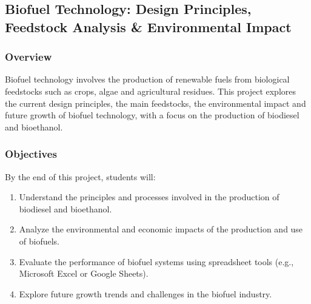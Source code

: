 \documentclass[11pt]{article}
\begin{document}
\subsection{Biofuel Technology: Design Principles, Feedstock Analysis & Environmental Impact}

\subsubsection*{Overview}
Biofuel technology involves the production of renewable fuels from biological feedstocks such as crops, algae and agricultural residues. This project explores the current design principles, the main feedstocks, the environmental impact and future growth of biofuel technology, with a focus on the production of biodiesel and bioethanol.

\subsubsection*{Objectives}
By the end of this project, students will:
\begin{enumerate}
    \item Understand the principles and processes involved in the production of biodiesel and bioethanol.
    \item Analyze the environmental and economic impacts of the production and use of biofuels.
    \item Evaluate the performance of biofuel systems using spreadsheet tools (e.g., Microsoft Excel or Google Sheets).
    \item Explore future growth trends and challenges in the biofuel industry.
\end{enumerate}
\end{document}
